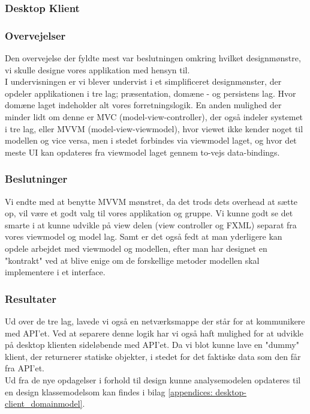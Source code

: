 \subsubsection{Desktop Klient}
\subsubsection{Overvejelser}
Den overvejelse der fyldte mest var beslutningen omkring hvilket designmønstre, vi skulle designe vores applikation med hensyn til.\\
I undervisningen er vi blever undervist i et simplificeret designmønster, der opdeler applikationen i tre lag; præsentation, domæne - og persistens lag. Hvor domæne laget indeholder alt vores forretningslogik. En anden mulighed der minder lidt om denne er MVC (model-view-controller), der også indeler systemet i tre lag, eller MVVM (model-view-viewmodel), hvor viewet ikke kender noget til modellen og vice versa, men i stedet forbindes via viewmodel laget, og hvor det meste UI kan opdateres fra viewmodel laget gennem to-vejs data-bindings.

\subsubsection{Beslutninger}
Vi endte med at benytte MVVM mønstret, da det trods dets overhead at sætte op, vil være et godt valg til vores applikation og gruppe. Vi kunne godt se det smarte i at kunne udvikle på view delen (view controller og FXML) separat fra vores viewmodel og model lag. Samt er det også fedt at man yderligere kan opdele arbejdet med viewmodel og modellen, efter man har designet en "kontrakt" ved at blive enige om de forskellige metoder modellen skal implementere i et interface.

\subsubsection{Resultater}
Ud over de tre lag, lavede vi også en netværksmappe der står for at kommunikere med API'et. Ved at separere denne logik har vi også haft mulighed for at udvikle på desktop klienten sideløbende med API'et. Da vi blot kunne lave en "dummy" klient, der returnerer statiske objekter, i stedet for det faktiske data som den får fra API'et. \\

Ud fra de nye opdagelser i forhold til design kunne analysemodelen opdateres til en design klassemodelsom kan findes i bilag \ref{appendices: desktop-client_domainmodel}.


